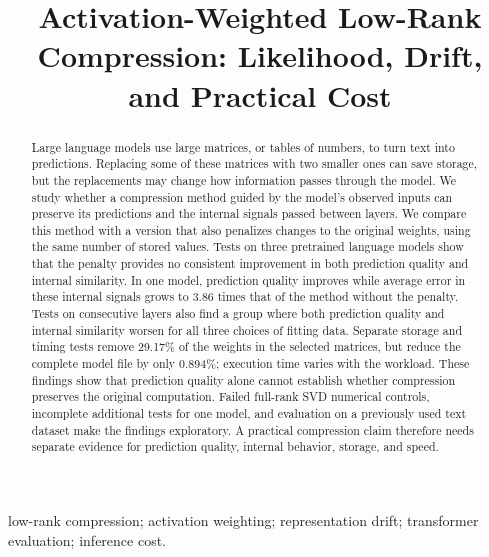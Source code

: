 \documentclass[conference]{IEEEtran}
\begin{document}
\title{Activation-Weighted Low-Rank Compression: Likelihood, Drift, and Practical Cost}
\author{}
\maketitle
\begin{abstract}Large language models use large matrices, or tables of numbers, to turn text into predictions. Replacing some of these matrices with two smaller ones can save storage, but the replacements may change how information passes through the model. We study whether a compression method guided by the model's observed inputs can preserve its predictions and the internal signals passed between layers. We compare this method with a version that also penalizes changes to the original weights, using the same number of stored values. Tests on three pretrained language models show that the penalty provides no consistent improvement in both prediction quality and internal similarity. In one model, prediction quality improves while average error in these internal signals grows to 3.86 times that of the method without the penalty. Tests on consecutive layers also find a group where both prediction quality and internal similarity worsen for all three choices of fitting data. Separate storage and timing tests remove 29.17\% of the weights in the selected matrices, but reduce the complete model file by only 0.894\%; execution time varies with the workload. These findings show that prediction quality alone cannot establish whether compression preserves the original computation. Failed full-rank SVD numerical controls, incomplete additional tests for one model, and evaluation on a previously used text dataset make the findings exploratory. A practical compression claim therefore needs separate evidence for prediction quality, internal behavior, storage, and speed.\end{abstract}
\begin{IEEEkeywords}low-rank compression; activation weighting; representation drift; transformer evaluation; inference cost.\end{IEEEkeywords}
\end{document}

